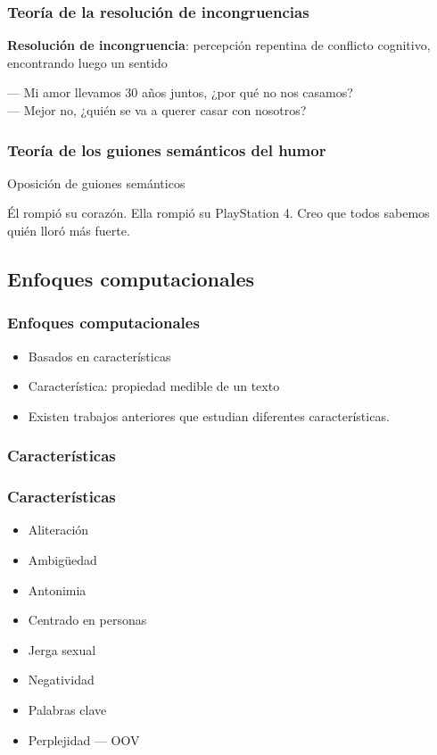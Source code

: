 \begin{frame}
    \frametitle{Teoría de la resolución de incongruencias}

    \textbf{Resolución de incongruencia}: percepción repentina de conflicto cognitivo, encontrando luego un sentido
    \begin{example}
        --- Mi amor llevamos 30 años juntos, ¿por qué no nos casamos? \\
        --- Mejor no, ¿quién se va a querer casar con nosotros?
    \end{example}
\end{frame}

\begin{frame}
    \frametitle{Teoría de los guiones semánticos del humor}

    Oposición de guiones semánticos

    \begin{example}
        Él rompió su corazón. Ella rompió su PlayStation 4. Creo que todos sabemos quién lloró más fuerte.
    \end{example}
\end{frame}

\subsection{Enfoques computacionales}
\begin{frame}
    \frametitle{Enfoques computacionales}

    \begin{itemize}
        \item Basados en características

        \item Característica: propiedad medible de un texto

        \item Existen trabajos anteriores que estudian diferentes características.
    \end{itemize}
\end{frame}

\subsubsection{Características}

\begin{frame}
    \frametitle{Características}

    \begin{itemize}
        \item Aliteración
        \item Ambigüedad
        \item Antonimia
        \item Centrado en personas
        \item Jerga sexual
        \item Negatividad
        \item Palabras clave
        \item Perplejidad --- OOV
    \end{itemize}
\end{frame}

